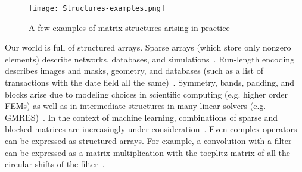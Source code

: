 \begin{figure}
	\texttt{[image: Structures-examples.png]}
    \vspace{-12pt}
    \caption{A few examples of matrix structures arising in practice}
    \vspace{-8pt}
\end{figure}
Our world is full of structured arrays.
%
Sparse arrays (which store only nonzero elements) describe networks, databases, and simulations~\cite{abhyankarpetsc, bell2007lessons, mcauley2013hidden, balay2020petsc}.
%
Run-length encoding describes images and masks, geometry, and
databases (such as a list of transactions with the date field all the same)~\cite{shi2020column,golomb1966run}.
%
Symmetry, bands, padding, and blocks arise due to modeling choices in scientific computing (e.g. higher order FEMs) as well as in intermediate structures in many linear solvers (e.g. GMRES)~\cite{ded, saad2003iterative, o2009scientific}.
%
In the context of machine learning, combinations of sparse and blocked matrices are increasingly under consideration~\cite{dao2022monarch}.
%
Even complex operators can be expressed as structured arrays.
%
For example, a convolution with a filter can be expressed as a matrix multiplication
with the toeplitz matrix of all the circular shifts of the filter~\cite{sze2017efficient}.

